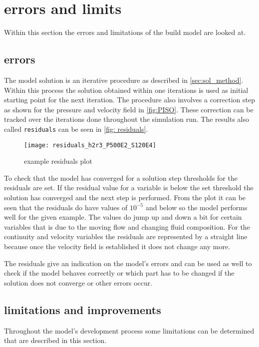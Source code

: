 \documentclass[../thesis.tex]{subfiles}
\begin{document}
\chapter{errors and limits}
\label{chp:err_lims}

Within this section the errors and limitations of the build model are looked at.

\section{errors}

The model solution is an iterative procedure as described in \autoref{sec:sol_method}. Within this process the solution obtained within one iterations is used as initial starting point for the next iteration. The procedure also involves a correction step as shown for the pressure and velocity field in \autoref{fig:PISO}. These correction can be tracked over the iterations done throughout the simulation run. The results also called \texttt{residuals} can be seen in \autoref{fig: residuals}.
\begin{figure}[htbp]
	\centering
	\texttt{[image: residuals\_h2r3\_P500E2\_S120E4]}
	\caption{example residuals plot}
	\label{fig: residuals}
\end{figure}
To check that the model has converged for a solution step thresholds for the residuals are set. If the residual value for a variable is below the set threshold the solution has converged and the next step is performed. From the plot it can be seen that the residuals do have values of $10^{-5}$ and below so the model performs well for the given example. The values do jump up and down a bit for certain variables that is due to the moving flow and changing fluid composition. For the continuity and velocity variables the residuals are represented by a straight line because once the velocity field is established it does not change any more.

The residuals give an indication on the model's errors and can be used as well to check if the model behaves correctly or which part has to be changed if the solution does not converge or other errors occur.

\section{limitations and improvements}
\label{sec: lim_improv}
Throughout the model's development process some limitations can be determined that are described in this section.
\end{document}
